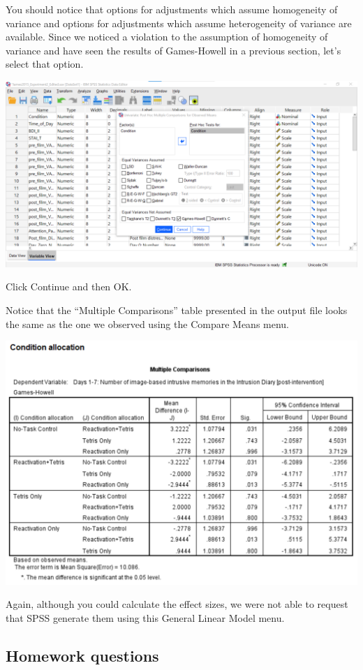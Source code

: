 \documentclass[
]{book}
\begin{document}
You should notice that options for adjustments which assume homogeneity of variance and options for adjustments which assume heterogeneity of variance are available. Since we noticed a violation to the assumption of homogeneity of variance and have seen the results of Games-Howell in a previous section, let's select that option.

\includegraphics{img/8.6.6.50.png}

Click {Continue} and then {OK}.

Notice that the ``Multiple Comparisons'' table presented in the output file looks the same as the one we observed using the {Compare Means} menu.

\includegraphics{img/8.6.6.51.png}

Again, although you could calculate the effect sizes, we were not able to request that SPSS generate them using this {General Linear Model} menu.

\hypertarget{homework-questions-1}{%
\subsection{Homework questions}\label{homework-questions-1}}
\end{document}

